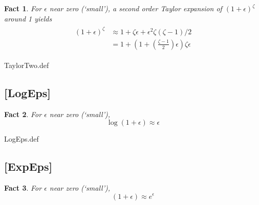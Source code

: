 \documentclass{handout}
\newtheorem{Fact}{Fact}
\providecommand{\currentpdfbookmark}{}
\begin{document}
\begin{Fact} For $\epsilon$ near zero (`small'), a second order Taylor expansion
of $(1+\epsilon)^{\zeta}$ around 1 yields
\begin{equation}\begin{gathered}\begin{aligned}
 (1+\epsilon)^{\zeta} & \approx  1+ \zeta \epsilon  + \epsilon^{2} \zeta (\zeta-1)/2 
\\ & =  1 + \left(1 + \left(\frac{\zeta - 1}{2}\right)\epsilon\right)\zeta \epsilon 
\end{aligned}\end{gathered}\end{equation}
\end{Fact}

\begin{verbatimwrite}{TaylorTwo.def}
\providecommand{\TaylorTwo}{\href{http://www.econ2.jhu.edu/people/ccarroll/public/LectureNotes/MathFacts/MathFactsList\#TaylorTwo}{\ensuremath{\mathtt{[TaylorTwo]}}}}
\end{verbatimwrite}



\hypertarget{LogEps}{}
\subsection{[LogEps]}\label{fact:LogEps}

\begin{Fact} For $\epsilon$ near zero (`small'), 
\begin{equation}
\log (1+\epsilon) \approx \epsilon
\end{equation}
\end{Fact}

\begin{verbatimwrite}{LogEps.def}
\providecommand{\LogEps}{\href{http://www.econ2.jhu.edu/people/ccarroll/public/LectureNotes/MathFacts/MathFactsList\#LogEps}{\ensuremath{\mathtt{[LogEps]}}}}
\end{verbatimwrite}


\hypertarget{ExpEps}{}
\subsection{[ExpEps]}
\begin{Fact} For $\epsilon$ near zero (`small'), 
\begin{equation}
(1+\epsilon) \approx e^{\epsilon}
\end{equation}
\end{Fact}
\end{document}
